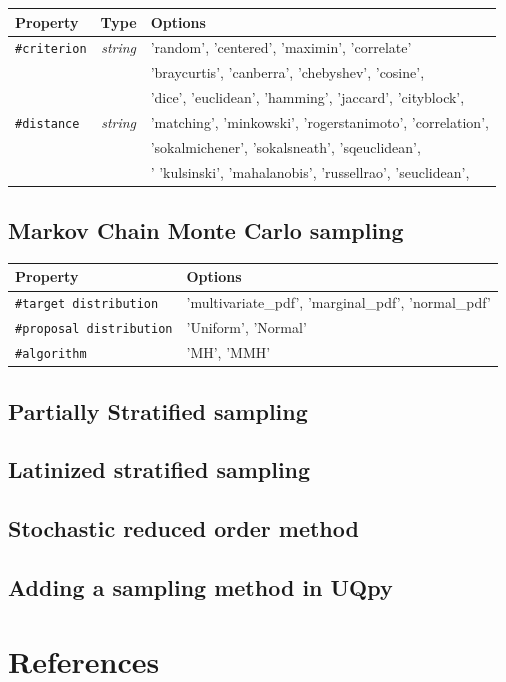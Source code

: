 \documentclass[preprint,12pt]{elsarticle}
\begin{document}
\begin{center}
	\begin{tabular}{ |l|c|l| } 
		\hline
		\textbf{Property} & \textbf{Type} & \textbf{Options} \\
		\hline
		\texttt{\#criterion}& \textit{string} &  'random', 'centered', 'maximin', 'correlate'  \\ 
		\hline
		\multirow{5}{*}{\texttt{\#distance}} & \multirow{5}{*}{\textit{string}} & 'braycurtis', 'canberra', 'chebyshev', 'cosine', \\ 
		&  &  'dice', 'euclidean', 'hamming', 'jaccard',  'cityblock',   \\ 
		&  &  'matching', 'minkowski', 'rogerstanimoto',  'correlation', \\ 
		&  & 'sokalmichener', 'sokalsneath', 'sqeuclidean',  \\ 
		&  & ' 'kulsinski', 'mahalanobis', 'russellrao', 'seuclidean',  \\ 
		\hline
	\end{tabular}
\end{center}


\subsection{Markov Chain Monte Carlo sampling}

\begin{center}
	\begin{tabular}{ |l|l| } 
		\hline
		\textbf{Property} &  \textbf{Options} \\
		\hline
		\texttt{\#target distribution}&   'multivariate\_pdf', 'marginal\_pdf', 'normal\_pdf'  \\ 
		\hline
		\texttt{\#proposal distribution}&   'Uniform', 'Normal'  \\ 
		\hline
		\texttt{\#algorithm}&   'MH', 'MMH'  \\ 
		\hline
	\end{tabular}
\end{center}


\subsection{Partially Stratified sampling}
\subsection{Latinized stratified sampling}
\subsection{Stochastic reduced order method}


\subsection{Adding a sampling method in UQpy}

\section*{References}
\end{document}
